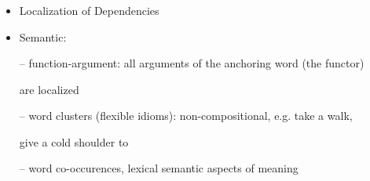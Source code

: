 \documentclass[compress,color=usenames]{beamer}
\begin{document}
\begin{frame}
\frametitle{}

\begin{itemize}
\item

Localization of Dependencies





\item Semantic:


-- function-argument: all arguments of the anchoring word (the functor)


are localized


-- word clusters (ﬂexible idioms): non-compositional, e.g. take a walk,


give a cold shoulder to


-- word co-occurences, lexical semantic aspects of meaning
\end{itemize}
\end{frame}
\end{document}
